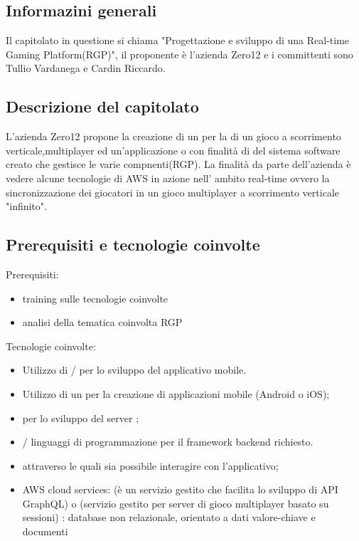 \subsection{Informazini generali}
Il capitolato in questione si chiama "Progettazione e sviluppo di una {Real-time Gaming Platform(RGP)}", il proponente è l'azienda Zero12 e i committenti sono Tullio Vardanega e Cardin Riccardo.

\subsection{Descrizione del capitolato}
L’azienda Zero12 propone la creazione di un  per la  di un gioco a scorrimento verticale,multiplayer ed un'applicazione  o  con finalità di  del sistema software creato che gestisce le varie compnenti(RGP).
La finalità da parte dell’azienda è vedere alcune tecnologie di AWS in azione nell' ambito real-time ovvero la sincronizzazione dei giocatori in un gioco multiplayer a scorrimento verticale "infinito".
\subsection{Prerequisiti e tecnologie coinvolte}
Prerequisiti:
\begin{itemize}
\item training sulle tecnologie coinvolte
\item analisi della tematica coinvolta RGP 
\end{itemize}
Tecnologie coinvolte:
\begin{itemize}
\item Utilizzo di / per lo sviluppo del applicativo mobile.
\item Utilizzo di un  per la creazione di applicazioni mobile (Android o iOS);
\item {} per lo sviluppo del server ;
\item {}/ linguaggi di programmazione per il framework backend richiesto.
\item {}  attraverso le quali sia possibile interagire con l'applicativo;
\item AWS cloud services: 
(è un servizio gestito che facilita lo sviluppo di API GraphQL) o (servizio gestito per server di gioco multiplayer basato su sessioni) 
: database non relazionale, orientato a dati valore-chiave e documenti
\end{itemize}

